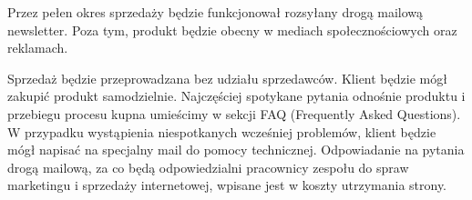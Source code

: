 \documentclass[12pt]{article}
\begin{document}
Przez pełen okres sprzedaży będzie funkcjonował rozsyłany drogą mailową newsletter.
Poza tym, produkt będzie obecny w mediach społecznościowych oraz reklamach.

\begin{table}[h!]
 \begin{center}
 \caption{Prognoza sprzedaży na pierwsze 4 lata}
 \label{table:sales}
 \end{center}
\end{table}

Sprzedaż będzie przeprowadzana bez udziału sprzedawców.
Klient będzie mógł zakupić produkt samodzielnie.
Najczęściej spotykane pytania odnośnie produktu i przebiegu procesu kupna umieścimy w sekcji FAQ (Frequently Asked Questions).
W przypadku wystąpienia niespotkanych wcześniej problemów, klient będzie mógł napisać na specjalny mail do pomocy technicznej.
Odpowiadanie na pytania drogą mailową, za co będą odpowiedzialni pracownicy zespołu do spraw marketingu i sprzedaży internetowej, wpisane jest w koszty utrzymania strony.
\end{document}
